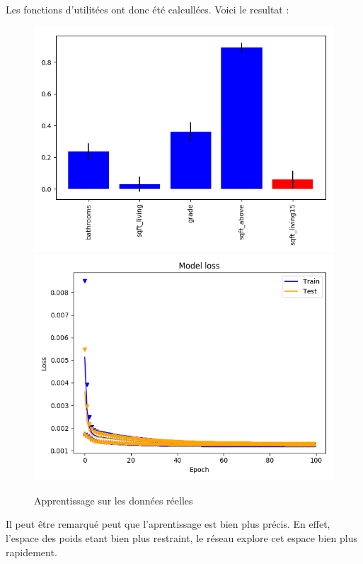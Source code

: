 Les fonctions d'utilitées ont donc été calcullées.
Voici le resultat :
\begin{figure}[H]
    \center
    \includegraphics[height=\petit]{pict/real/resut.png}
    \includegraphics[height=\petit]{pict/real/learnut.png}
	\caption{Apprentissage sur les données réelles}
	\label{fig:ut1_100_100}
\end{figure}
Il peut être remarqué peut que l'aprentissage est bien plus précis.
En effet, l'espace des poids etant bien plus restraint,
le réseau explore cet espace bien plus rapidement.


